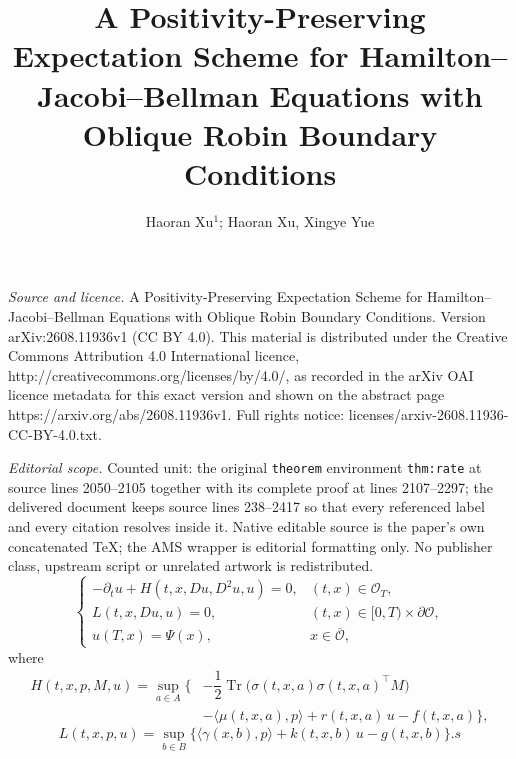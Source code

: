 \documentclass[10pt,a4paper]{amsart}
\newcommand{\cO}{\mathcal{O}}
\newcommand{\Tr}{\operatorname{Tr}}
\begin{document}
\title[A Positivity-Preserving Expectation Scheme for Hamilton--Jac]{A Positivity-Preserving Expectation Scheme for Hamilton--Jacobi--Bellman Equations with Oblique Robin Boundary Conditions}
\author{Haoran Xu$^1$; Haoran Xu, Xingye Yue}
\date{}
\maketitle
\noindent\emph{Source and licence.} A Positivity-Preserving Expectation Scheme for Hamilton--Jacobi--Bellman Equations with Oblique Robin Boundary Conditions. Version arXiv:2608.11936v1 (CC BY 4.0). This material is distributed under the Creative Commons Attribution 4.0 International licence, http://creativecommons.org/licenses/by/4.0/, as recorded in the arXiv OAI licence metadata for this exact version and shown on the abstract page https://arxiv.org/abs/2608.11936v1. Full rights notice: licenses/arxiv-2608.11936-CC-BY-4.0.txt.\par\smallskip
\noindent\textit{Editorial scope.} Counted unit: the original \texttt{theorem} environment \texttt{thm:rate} at source lines 2050--2105 together with its complete proof at lines 2107--2297; the delivered document keeps source lines 238--2417 so that every referenced label and every citation resolves inside it. Native editable source is the paper's own concatenated TeX; the AMS wrapper is editorial formatting only. No publisher class, upstream script or unrelated artwork is redistributed.
	\begin{equation}
		\begin{cases}
			-\partial_t u + H(t,x,Du,D^2u,u) = 0, & (t,x)\in\cO_T, \\[8pt]
			L(t,x,Du,u) = 0, & (t,x)\in[0,T)\times\partial\cO, \\[8pt]
			u(T,x) = \Psi(x), & x\in\overline{\cO},
		\end{cases}
		\label{eq:HJB-main}
	\end{equation}
	where
	\begin{equation}
		\label{eq:HJB-H}
		\begin{aligned}
			H(t,x,p,M,u) = \sup_{a\in A}\Big\{
			&-\dfrac{1}{2}\Tr\big(\sigma(t,x,a)\sigma(t,x,a)^{\top}M\big) \\
			&-\langle\mu(t,x,a),p\rangle
			+ r(t,x,a)\,u - f(t,x,a) \Big\},
		\end{aligned}
	\end{equation}
	\begin{equation}
		\label{eq:HJB-L}
		L(t,x,p,u) = \sup_{b\in B}\Big\{
		\langle\gamma(x,b),p\rangle + k(t,x,b)\,u - g(t,x,b) \Big\}.
 s	\end{equation}
\end{document}
